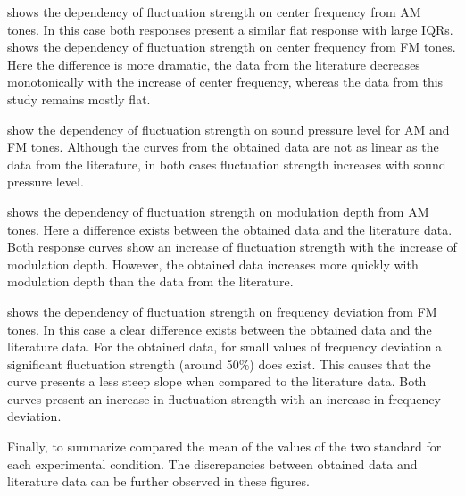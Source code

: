 \documentclass[../../main.tex]{subfiles}
\begin{document}
 shows the dependency of fluctuation strength
on center frequency from \gls{AM} tones. In this case both responses present a
similar flat response with large \gls{IQR}s. 
shows the dependency of fluctuation strength on center frequency from \gls{FM}
tones. Here the difference is more dramatic, the data from the literature
decreases monotonically with the increase of center frequency, whereas the data
from this study remains mostly flat.

 show the
dependency of fluctuation strength on sound pressure level for \gls{AM} and
\gls{FM} tones. Although the curves from the obtained data are not as linear as
the data from the literature, in both cases fluctuation strength increases with
sound pressure level.

 shows the dependency of fluctuation strength
on modulation depth from \gls{AM} tones. Here a difference exists between the
obtained data and the literature data. Both response curves show an increase
of fluctuation strength with the increase of modulation depth. However, the
obtained data increases more quickly with modulation depth than the data from
the literature.

 shows the dependency of fluctuation strength
on frequency deviation from \gls{FM} tones. In this case a clear difference
exists between the obtained data and the literature data. For the obtained data,
for small values of frequency deviation a significant fluctuation strength
(around 50\%) does exist. This causes that the curve presents a less steep slope
when compared to the literature data. Both curves present an increase in
fluctuation strength with an increase in frequency deviation.

Finally, to summarize  compared the
mean of the values of the two standard for each experimental condition. The
discrepancies between obtained data and literature data can be further observed
in these figures.
\end{document}
